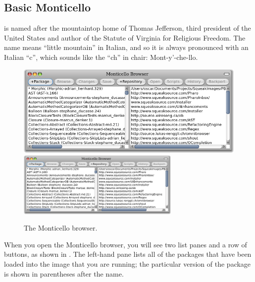 \documentclass[a4paper,10pt,twoside]{book}
\begin{document}

\subsection{Basic Monticello}

 is named after the mountaintop home of Thomas Jefferson, third president of the United States and author of the Statute of Virginia for Religious Freedom.  The name means ``little mountain'' in Italian, and so it is always pronounced with an Italian ``c'', which sounds like the ``ch'' in chair: Mont-y'-che-llo.


\begin{figure}[btp]
	\begin{center}
	\ifluluelse
		{\includegraphics[width=\textwidth]{freshMonticello}}
		{\includegraphics[width=0.7\textwidth]{freshMonticello}}
	\end{center}
	\caption{The Monticello browser.}
\end{figure}

When you open the Monticello browser, you will see two list panes and a row of buttons, as shown in .
The left-hand pane lists all of the packages that have been loaded into the image that you are running; the particular version of the package is shown in parentheses after the name.
\end{document}
